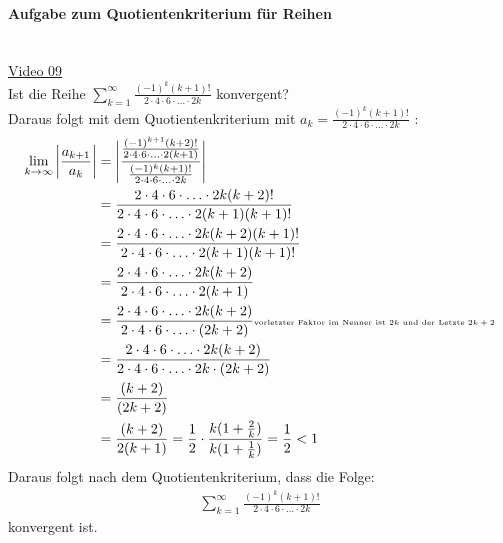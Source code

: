 \paragraph{Aufgabe zum Quotientenkriterium für Reihen}$  $\vspace*{3mm}\\
\href{https://youtu.be/Zp1q1k58Tqk}{Video 09}\\
Ist die Reihe $ \sum\limits_{k=1}^{\infty}\frac{(-1)^k(k+1)!}{2\cdot 4\cdot 6 \cdot\ldots \cdot 2k} $ konvergent?\\
Daraus folgt mit dem Quotientenkriterium mit $ a_k=\frac{(-1)^k(k+1)!}{2\cdot 4\cdot 6 \cdot\ldots \cdot 2k} $ :\\
\begin{align*}
\lim\limits_ {k\to\infty}\bigg|\frac{a_{k+1}}{a_k}\bigg|&=\Bigg|\frac{\frac{(-1)^{k+1}(k+2)!}{2\cdot 4\cdot 6\cdot\ldots\cdot 2(k+1)}}{\frac{(-1)^{k}(k+1)!}{2\cdot 4\cdot 6\cdot\ldots\cdot 2k}}\Bigg|\\
&=\frac{2\cdot 4\cdot 6\cdot\ldots\cdot2k(k+2)!}{2\cdot 4\cdot 6 \cdot\ldots \cdot 2(k+1)(k+1)!}\\
&=\frac{2\cdot 4\cdot 6\cdot\ldots\cdot2k(k+2)(k+1)!}{2\cdot 4\cdot 6 \cdot\ldots \cdot 2(k+1)(k+1)!}\\
&=\frac{2\cdot 4\cdot 6\cdot\ldots\cdot2k(k+2)}{2\cdot 4\cdot 6\cdot\ldots\cdot2(k+1)}\\
&=\frac{2\cdot 4\cdot 6\cdot\ldots\cdot2k(k+2)}{2\cdot 4\cdot 6\cdot\ldots\cdot (2k+2)}\text{\tiny vorletzter Faktor im Nenner ist $ 2k $ und der Letzte $ 2k+2 $}\\
&=\frac{2\cdot 4\cdot 6\cdot\ldots\cdot2k(k+2)}{2\cdot 4\cdot 6\cdot\ldots\cdot 2k\cdot(2k+2)}\\
&=\frac{(k+2)}{(2k+2)}\\
&=\frac{(k+2)}{2(k+1)}=\frac{1}{2}\cdot\frac{k(1+\frac{2}{k})}{k(1+\frac{1}{k})}=\frac{1}{2}<1
\end{align*}
Daraus folgt nach dem Quotientenkriterium, dass die Folge:\\
\begin{align*}
\sum\limits_{k=1}^{\infty}\frac{(-1)^k(k+1)!}{2\cdot 4\cdot 6 \cdot\ldots \cdot 2k}
\end{align*}
konvergent ist.\\
\newpage
\noindent

